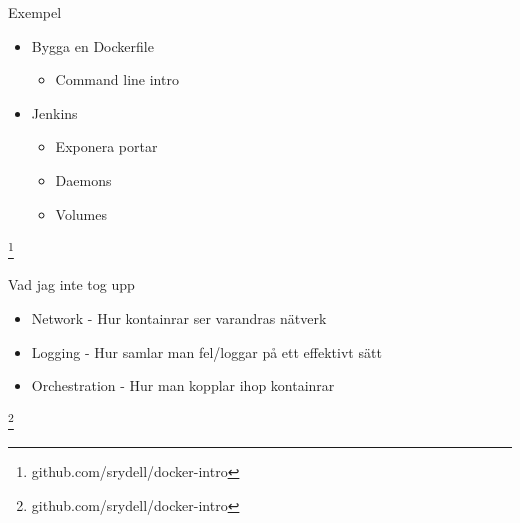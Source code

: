 \documentclass[12pt]{beamer}
\newcommand\blfootnote[1]{%
  \begingroup
  \renewcommand\thefootnote{}\footnote{#1}%
  \addtocounter{footnote}{-1}%
  \endgroup
}
\begin{document}
\begin{frame}{Exempel}
     \begin{itemize}
         \item Bygga en Dockerfile
         \begin{itemize}
             \item Command line intro
         \end{itemize}
         \item Jenkins
         \begin{itemize}
             \item Exponera portar
             \item Daemons
             \item Volumes
         \end{itemize}
     \end{itemize}
     \blfootnote{github.com/srydell/docker-intro}
\end{frame}

\begin{frame}{Vad jag inte tog upp}
    \begin{itemize}
        \item Network - Hur kontainrar ser varandras nätverk
        \item Logging - Hur samlar man fel/loggar på ett effektivt sätt
        \item Orchestration - Hur man kopplar ihop kontainrar
    \end{itemize}
     \blfootnote{github.com/srydell/docker-intro}
\end{frame}
\end{document}
